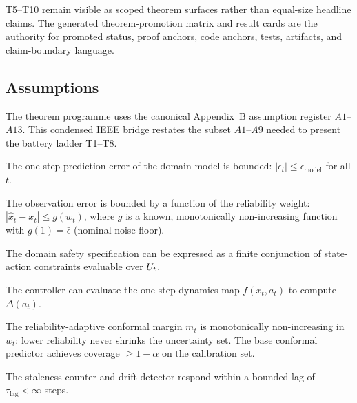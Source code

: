 T5--T10 remain visible as scoped theorem surfaces rather than equal-size
headline claims.  The generated theorem-promotion matrix and result cards are
the authority for promoted status, proof anchors, code anchors, tests,
artifacts, and claim-boundary language.

\subsection{Assumptions}\label{sec:assumptions}

The theorem programme uses the canonical Appendix~B assumption register
$A1$--$A13$.  This condensed IEEE bridge restates the subset $A1$--$A9$
needed to present the battery ladder T1--T8.

\begin{assumption}\label{ass:A1}
The one-step prediction error of the domain model is bounded:
$|\epsilon_t| \le \epsilon_{\mathrm{model}}$ for all $t$.
\end{assumption}

\begin{assumption}\label{ass:A2}
The observation error is bounded by a function of the reliability weight:
$|\hat{x}_t - x_t| \le g(w_t)$, where $g$ is a known, monotonically
non-increasing function with $g(1) = \bar\epsilon$ (nominal noise floor).
\end{assumption}

\begin{assumption}\label{ass:A3}
The domain safety specification can be expressed as a finite conjunction of
state-action constraints evaluable over $U_t$.
\end{assumption}

\begin{assumption}\label{ass:A4}
The controller can evaluate the one-step dynamics map $f(x_t, a_t)$ to compute
$\Delta(a_t)$.
\end{assumption}

\begin{assumption}\label{ass:A5}
The reliability-adaptive conformal margin $m_t$ is monotonically non-increasing in
$w_t$: lower reliability never shrinks the uncertainty set.  The base conformal
predictor achieves coverage $\ge 1 - \alpha$ on the calibration set.
\end{assumption}

\begin{assumption}\label{ass:A6}
The staleness counter and drift detector respond within a bounded lag of
$\tau_{\mathrm{lag}} < \infty$ steps.
\end{assumption}

